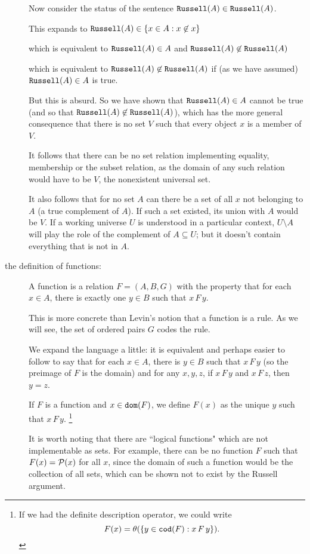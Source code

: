 \documentclass[12pt]{article}
\begin{document}
\begin{description}
Now consider the status of the sentence ${\tt Russell}(A) \in {\tt Russell}(A)$.

This expands to ${\tt Russell}(A) \in \{x \in A:x \not\in x\}$

which is equivalent to ${\tt Russell}(A) \in A$ and ${\tt Russell}(A) \not\in {\tt Russell}(A)$

which is equivalent to ${\tt Russell}(A) \not\in {\tt Russell}(A)$ if (as we have assumed) ${\tt Russell}(A)\in A$ is true.

But this is absurd.  So we have shown that ${\tt Russell}(A)\in A$  cannot be true (and so that ${\tt Russell}(A) \not\in {\tt Russell}(A)$), which has the more general consequence
that there is no set $V$ such that every object $x$ is a member of $V$.

It follows that there can be no set relation implementing equality, membership or the subset relation, as the domain of any such relation would have to be $V$, the nonexistent universal set.

It also follows that for no set $A$ can there be a set of all $x$ not belonging to $A$ (a true complement of $A$).
If such a set existed, its union with $A$ would be $V$.  If a working universe $U$ is understood in a particular context,
$U \setminus A$ will play the role of the complement of $A \subseteq U$;  but it doesn't contain everything that is not in $A$.



\item[the definition of functions:]

A function is a relation $F = (A,B,G)$ with the property that for each $x \in A$, there is exactly one $y \in B$ such that $x \, F \, y$.

This is more concrete than Levin's notion that a function is a rule.  As we will see, the set of ordered pairs $G$ codes the rule.

We expand the language a little:  it is equivalent and perhaps easier to follow to say that for each $x \in A$, there is $y \in B$ such that $x \, F\, y$ (so the preimage of $F$ is the domain) and for any $x,y,z$, if $x \, F \, y$ and $x \, F\, z$, then $y=z$.

If $F$ is a function and $x \in {\tt dom}(F)$, we define $F(x)$ as the unique $y$ such that $x \, F \, y$.  \footnote{If we had the definite description operator, we could write $$F(x) = \theta(\{y\in {\tt cod}(F):x \, F \, y\}).$$}

It is worth noting that there are ``logical functions" which are not implementable as sets.  For example,
there can be no function $F$ such that $F(x) = {\cal P}(x)$ for all $x$, since the domain of such a function would be the collection of all sets, which can be shown not to exist by the Russell argument.


\end{description}
\end{document}
